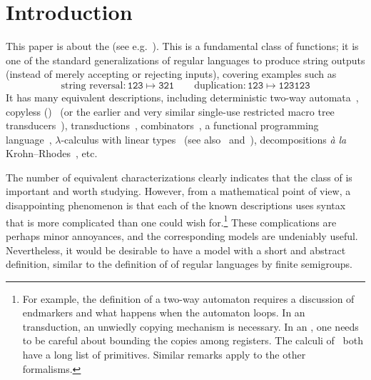 \section{Introduction}
\label{sec:intro}

This paper is about the  (see e.g.~\cite{MuschollPuppis}). This is a
fundamental class of functions; it is one of the standard generalizations of regular languages to produce string
outputs (instead of merely accepting or rejecting inputs), covering examples such as
\[ \text{string reversal}\colon \mathtt{123 \mapsto 321} \qquad \text{duplication}\colon \mathtt{123 \mapsto 123123}\]
It has many equivalent descriptions, including deterministic two-way automata~\cite[Note~4]{shepherdson1959reduction}, copyless  (\sst)~\cite[Section~3]{alurExpressivenessStreamingString2010} (or the earlier and very similar single-use restricted macro tree transducers~\cite[Section~5]{MacroMSO}), \mso transductions~\cite[Theorem~13]{engelfrietMSODefinableString2001}, combinators~\cite[Section~2]{alur2014regular}, a functional programming language~\cite[Section~6]{bojanczykRegularFirstOrderList2018}, $\lambda$-calculus with linear types~\cite[Theorem~3]{LambdaTransducer} (see also~\cite[Claim~6.2]{IATLC} and~\cite[Theorem~1.2.3]{titoPhD}), decompositions \textit{à la} Krohn--Rhodes~\cite[Theorem~18, item~4]{bojanczykstefanski2020}, etc.

The number of equivalent characterizations clearly indicates that
the class of  is important and worth studying. However, from a mathematical point of view, a disappointing phenomenon is that each of the known descriptions uses syntax that is more complicated than one could wish for.\footnote{For example, the definition of a two-way automaton requires a discussion of endmarkers and what happens when the automaton loops. In an \mso transduction, an unwiedly copying mechanism is necessary. In an \sst, one needs to be careful about bounding the copies among registers.
The calculi of~\cite{alur2014regular,bojanczykRegularFirstOrderList2018} both have a long list of primitives.
Similar remarks apply to the other formalisms.}
These complications are perhaps minor annoyances, and the corresponding models are undeniably useful. Nevertheless, it would be desirable to have a model with a short and abstract definition, similar to the definition of  of regular languages by finite semigroups. %


